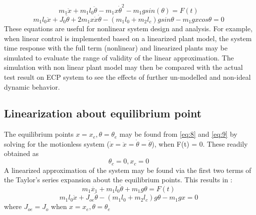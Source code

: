 \documentclass[12pt, a4paper]{article}
\begin{document}
\begin{equation}\label{eq:9}
m_1\ddot{x} + m_1l_0\ddot{\theta} - m_1x\dot{\theta}^2 - m_1gsin(\theta) = F(t)
\end{equation}
\begin{equation}\label{eq:10}
m_1l_0\ddot{x} + J_0\ddot{\theta} + 2m_1x\dot{x}\dot{\theta} - (m_1l_0 + m_2l_c)gsin\theta - m_1gxcos\theta = 0 
\end{equation}
These equations are useful for nonlinear system design and analysis. For example, when linear control is implemented based on a linearized plant model, the system time response with the full term (nonlinear) and linearized plants may be simulated to evaluate the range of validity of the linear approximation. The simulation with non linear plant model may then be compared with the actual test result on ECP system to see the effects of further un-modelled and non-ideal dynamic behavior.
\subsection{Linearization about equilibrium point}
The equilibrium points $x = x_e, \theta = \theta_e$ may be found from \eqref{eq:8} and \eqref{eq:9} by solving for the motionless system ($\dot{x} = \ddot{x} = \dot{\theta} = \ddot{\theta}$), when F(t) = 0. These readily obtained as 
\begin{equation}\label{eq:11}
\theta_c = 0, x_c = 0
\end{equation}
A linearized approximation of the system may be found via the first two terms of the Taylor's series expansion about the equilibrium points. This results in :
\begin{equation}\label{eq:12}
m_1\ddot{x_1} + m_1l_0\ddot{\theta} + m_1g\theta = F(t)
\end{equation}
\begin{equation}\label{eq:13}
m_1l_0\ddot{x} + J_{oe}\ddot{\theta} - (m_1l_0 + m_2l_c)g\theta -m_1gx = 0
\end{equation}
where $J_{oe} = J_o$ when $x = x_e, \theta = \theta_e$
\end{document}
